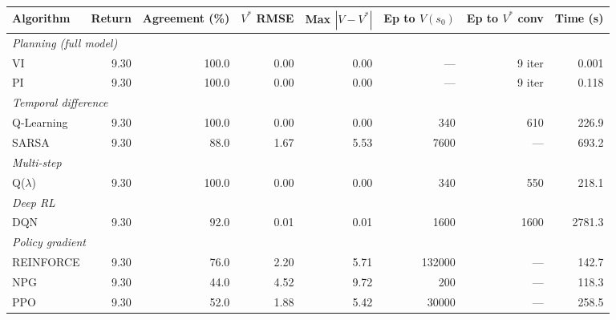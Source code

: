 \begin{tabular}{lrrrrrrr}
\hline
Algorithm & Return & Agreement (\%) & $V^*$ RMSE & Max $|V{-}V^*|$ & Ep to $V(s_0)$ & Ep to $V^*$ conv & Time (s) \\
\hline
\multicolumn{8}{l}{\emph{Planning (full model)}} \\
VI & 9.30 & 100.0 & 0.00 & 0.00 & --- & 9 iter & 0.001 \\
PI & 9.30 & 100.0 & 0.00 & 0.00 & --- & 9 iter & 0.118 \\
\hline
\multicolumn{8}{l}{\emph{Temporal difference}} \\
Q-Learning & 9.30 & 100.0 & 0.00 & 0.00 & 340 & 610 & 226.9 \\
SARSA & 9.30 & 88.0 & 1.67 & 5.53 & 7600 & --- & 693.2 \\
\hline
\multicolumn{8}{l}{\emph{Multi-step}} \\
Q($\lambda$) & 9.30 & 100.0 & 0.00 & 0.00 & 340 & 550 & 218.1 \\
\hline
\multicolumn{8}{l}{\emph{Deep RL}} \\
DQN & 9.30 & 92.0 & 0.01 & 0.01 & 1600 & 1600 & 2781.3 \\
\hline
\multicolumn{8}{l}{\emph{Policy gradient}} \\
REINFORCE & 9.30 & 76.0 & 2.20 & 5.71 & 132000 & --- & 142.7 \\
NPG & 9.30 & 44.0 & 4.52 & 9.72 & 200 & --- & 118.3 \\
PPO & 9.30 & 52.0 & 1.88 & 5.42 & 30000 & --- & 258.5 \\
\hline
\end{tabular}